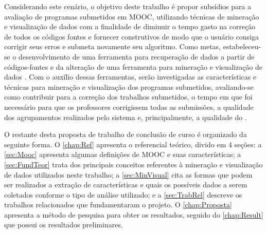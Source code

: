 %	
	
	Considerando este cenário, o objetivo deste trabalho é propor subsídios para a                       %
	avaliação de programas submetidos em MOOC, utilizando técnicas de mineração e visualização
	de dados com a finalidade de diminuir o tempo gasto na correção de todos os códigos
	fontes e  fornecer  construtivos de modo que o usuário consiga
	corrigir seus erros e submeta novamente seu algoritmo. Como metas, estabeleceu-se
	o desenvolvimento de uma ferramenta para recuperação de dados a partir de
	códigos-fontes e da alteração de uma ferramenta para mineração e visualização de
	dados \cite{Alencar-etal:2012}. Com o auxílio dessas ferramentas, serão investigadas as
	características e técnicas para mineração e visualização dos programas submetidos,
	avaliando-se como contribuir para a correção dos trabalhos submetidos, o tempo em
	que foi necessário para que os professores corrigissem todas as submissões, a
	qualidade dos agrupamentos realizados pelo sistema e, principalmente, a
	qualidade do .
	
	O restante desta proposta de trabalho de conclusão de curso é organizado da seguinte
	forma. O \cref{chap:Ref} apresenta o referencial teórico, divido em 4 seções: a
	\cref{sec:Mooc} apresenta algumas definições de MOOC e suas características; a
	\cref{sec:FundTeor} trata dos principais conceitos referentes à mineração e
	visualização de dados utilizados neste trabalho; a \cref{sec:MinVisual} cita as
	formas que podem ser realizados a extração de características e quais os possíveis
	dados a serem coletados conforme o tipo de análise utilizado; e a \cref{sec:TrabRel}
	descreve os trabalhos relacionados que fundamentaram o projeto. O \cref{chap:Proposta}
	apresenta a método de pesquisa para obter os resultados, seguido do \cref{chap:Result}
	que possui os resultados preliminares.
